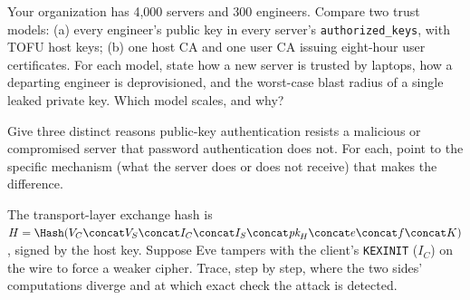 \begin{exercise}
Your organization has 4{,}000 servers and 300 engineers. Compare two trust models: (a) every engineer's public key in every server's \texttt{authorized\_keys}, with TOFU host keys; (b) one host CA and one user CA issuing eight-hour user certificates. For each model, state how a new server is trusted by laptops, how a departing engineer is deprovisioned, and the worst-case blast radius of a single leaked private key. Which model scales, and why?
\end{exercise}

\begin{exercise}
Give three distinct reasons public-key authentication resists a malicious or compromised server that password authentication does not. For each, point to the specific mechanism (what the server does or does not receive) that makes the difference.
\end{exercise}

\begin{exercise}
The transport-layer exchange hash is $H = \Hash(V_C \concat V_S \concat I_C \concat I_S \concat \textit{pk}_H \concat e \concat f \concat K)$, signed by the host key. Suppose Eve tampers with the client's \texttt{KEXINIT} ($I_C$) on the wire to force a weaker cipher. Trace, step by step, where the two sides' computations diverge and at which exact check the attack is detected.
\end{exercise}
